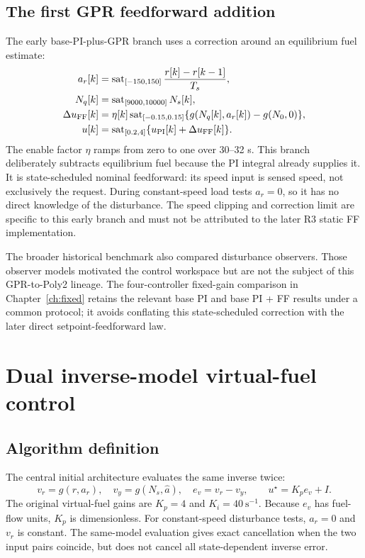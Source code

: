 \section{The first GPR feedforward addition}
The early base-PI-plus-GPR branch uses a correction around an equilibrium fuel estimate:
\begin{align}
a_r[k]&=\operatorname{sat}_{[-150,150]}\frac{r[k]-r[k-1]}{T_s},\\
N_q[k]&=\operatorname{sat}_{[9000,10000]}N_s[k],\\
\Delta u_{\rm FF}[k]&=\eta[k]\operatorname{sat}_{[-0.15,0.15]}
\{g(N_q[k],a_r[k])-g(N_0,0)\},\\
u[k]&=\operatorname{sat}_{[0.2,4]}\{u_{\rm PI}[k]+\Delta u_{\rm FF}[k]\}.
\end{align}
The enable factor $\eta$ ramps from zero to one over 30--32 s. This branch deliberately subtracts equilibrium fuel because the PI integral already supplies it. It is state-scheduled nominal feedforward: its speed input is sensed speed, not exclusively the request. During constant-speed load tests $a_r=0$, so it has no direct knowledge of the disturbance. The speed clipping and correction limit are specific to this early branch and must not be attributed to the later R3 static FF implementation.

The broader historical benchmark also compared disturbance observers. Those observer models motivated the control workspace but are not the subject of this GPR-to-Poly2 lineage. The four-controller fixed-gain comparison in Chapter~\ref{ch:fixed} retains the relevant base PI and base PI + FF results under a common protocol; it avoids conflating this state-scheduled correction with the later direct setpoint-feedforward law.


\chapter{Dual inverse-model virtual-fuel control}
\section{Algorithm definition}
The central initial architecture evaluates the same inverse twice:
\begin{equation}
v_r=g(r,a_r),\quad v_y=g(N_s,\hat a),\quad e_v=v_r-v_y,
\qquad u^\star=K_p e_v+I.
\label{eq:virtual}
\end{equation}
The original virtual-fuel gains are $K_p=4$ and $K_i=40\ \mathrm{s}^{-1}$. Because $e_v$ has fuel-flow units, $K_p$ is dimensionless. For constant-speed disturbance tests, $a_r=0$ and $v_r$ is constant. The same-model evaluation gives exact cancellation when the two input pairs coincide, but does not cancel all state-dependent inverse error.

